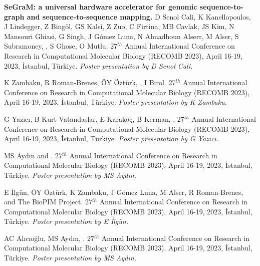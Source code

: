 \vspace{-.2cm}
{\bf SeGraM: a universal hardware accelerator for genomic sequence-to-graph and sequence-to-sequence mapping.} D Senol Cali, K Kanellopoulos, J Lindegger, Z Bingöl, GS Kalsi, Z Zuo, C Firtina, MB Cavlak, JS Kim, N Mansouri Ghiasi, G Singh, J Gómez Luna, N Almadhoun Alserr, M Alser, S Subramoney, \calkan{}, S Ghose, O Mutlu. 27$^{th}$ Annual International Conference on Research in Computational Molecular Biology (RECOMB 2023), April 16-19, 2023, İstanbul, Türkiye. {\it Poster presentation by D Senol Cali.}

 K Zambaku, R Roman-Brenes, ÖY Öztürk, \calkan{}, I Birol. 27$^{th}$ Annual International Conference on Research in Computational Molecular Biology (RECOMB 2023), April 16-19, 2023, İstanbul, Türkiye. {\it Poster presentation by K Zambaku.}


\vspace{-.2cm}{\bf Identification of protein-protein interaction
hubs in multiple sclerosis.} G Yazıcı, B Kurt Vatandaslar, E Karakoç, B Kerman, \calkan{}.
27$^{th}$ Annual International Conference on Research in Computational Molecular Biology (RECOMB 2023), April 16-19, 2023, İstanbul, Türkiye.
{\it Poster presentation by G Yazıcı.}



\vspace{-.2cm}{\bf Whole genome alignment via Alternating Lyndon Tree Factorization.} MS Aydın and \calkan{}. 27$^{th}$ Annual International Conference on Research in Computational Molecular Biology (RECOMB 2023), April 16-19, 2023, İstanbul, Türkiye. {\it Poster presentation by MS Aydın.}

\vspace{-.2cm}{\bf Characterization of alignment and search algorithms for short read, long read, and graph mappers.} E İlgün, ÖY Öztürk, K Zambaku, J Gómez Luna, M Alser, R Roman-Brenes, \calkan{} and The BioPIM Project. 27$^{th}$ Annual International Conference on Research in Computational Molecular Biology (RECOMB 2023), April 16-19, 2023, İstanbul, Türkiye. {\it Poster presentation by E İlgün.}

\vspace{-.2cm}{\bf Pairwise sequence alignment with block and character edit operations.} AC Alıcıoğlu, MS Aydın, \calkan{}. 27$^{th}$ Annual International Conference on Research in Computational Molecular Biology (RECOMB 2023), April 16-19, 2023, İstanbul, Türkiye. {\it Poster presentation by MS Aydın.}

